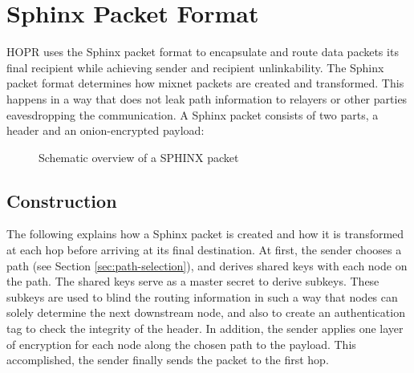 \section{Sphinx Packet Format}
\label{sec:sphinx}

HOPR uses the Sphinx packet format \cite{sphinxpaper} to encapsulate and route data packets its final recipient while achieving sender and recipient unlinkability. The Sphinx packet format determines how mixnet packets are created and transformed. This happens in a way that does not leak path information to relayers or other parties eavesdropping the communication. A Sphinx packet consists of two parts, a header and an onion-encrypted payload:

\begin{figure}[H]
    \centering
    \label{fig:sphinxoverview}
    \caption{Schematic overview of a SPHINX packet}
\end{figure}

\subsection{Construction}

The following explains how a Sphinx packet is created and how it is transformed at each hop before arriving at its final destination. At first, the sender chooses a path (see Section \ref{sec:path-selection}), and derives shared keys with each node on the path. The shared keys serve as a master secret to derive subkeys. These subkeys are used to blind the routing information in such a way that nodes can solely determine the next downstream node, and also to create an authentication tag to check the integrity of the header. In addition, the sender applies one layer of encryption for each node along the chosen path to the payload. This accomplished, the sender finally sends the packet to the first hop.

